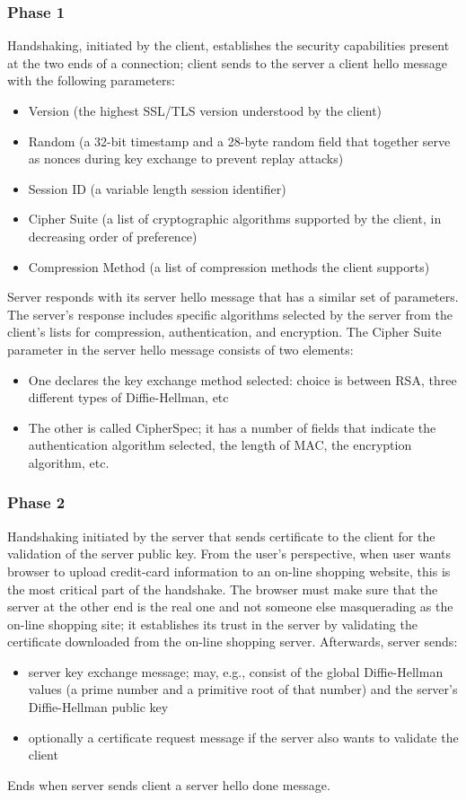\documentclass[a4paper, 10pt, titlepage]{article}
\begin{document}
\subsubsection{Phase 1}
Handshaking, initiated by the client, establishes the security capabilities present at the two ends of a connection; client sends to the server a client hello message with the following parameters:
\begin{itemize}
\item Version (the highest SSL/TLS version understood by the client)
\item Random (a 32-bit timestamp and a 28-byte random field that together serve as nonces during key exchange to prevent replay attacks)
\item Session ID (a variable length session identifier)
\item Cipher Suite (a list of cryptographic algorithms supported by the client, in decreasing order of preference)
\item Compression Method (a list of compression methods the client supports)
\end{itemize}
Server responds with its server hello message that has a similar set of parameters. The server’s response includes specific algorithms selected by the server from the client’s lists for compression, authentication, and encryption. The Cipher Suite parameter in the server hello message consists of two elements:
\begin{itemize}
\item One declares the key exchange method selected: choice is between RSA, three different types of Diffie-Hellman, etc
\item The other is called CipherSpec; it has a number of fields that indicate the authentication algorithm selected, the length of MAC, the encryption algorithm, etc.
\end{itemize}
\subsubsection{Phase 2}
Handshaking initiated by the server that sends certificate to the client for the validation of the server public key. From the user's perspective, when user wants browser to upload credit-card information to an on-line shopping website, this is the most critical part of the handshake. The browser must make sure that the server at the other end is the real one and not someone else masquerading as the on-line shopping site; it establishes its trust in the server by validating the certificate downloaded from the on-line shopping server. Afterwards, server sends:
\begin{itemize}
\item server key exchange message; may, e.g., consist of the global Diffie-Hellman values (a prime number and a primitive root of that number) and the server’s Diffie-Hellman public key
\item optionally a certificate request message if the server also wants to validate the client
\end{itemize}
Ends when server sends client a server hello done message.
\end{document}
